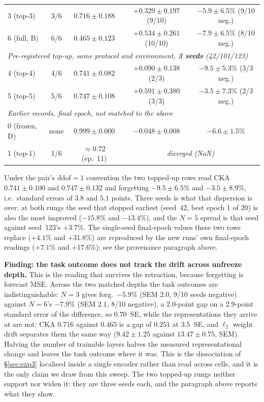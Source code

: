 \begin{table}[!ht]
\begin{tabular}{lcccc}
3 (top-3)    & 3/6   & $0.716{\pm}0.188$ & $+0.329{\pm}0.197$ (9/10) & $-5.9{\pm}6.5$\% (9/10 neg.) \\
6 (full, B)  & 6/6   & $0.465{\pm}0.123$ & $+0.534{\pm}0.261$ (10/10) & $-7.9{\pm}6.5$\% (8/10 neg.) \\
\midrule
\multicolumn{5}{l}{\emph{Pre-registered top-up, same protocol and environment, \textbf{3 seeds} (42/101/123)}} \\
4 (top-4)    & 4/6   & $0.741{\pm}0.082$ & $+0.090{\pm}0.138$ (2/3) & $-9.5{\pm}5.3$\% (3/3 neg.) \\
5 (top-5)    & 5/6   & $0.747{\pm}0.108$ & $+0.591{\pm}0.380$ (3/3) & $-3.5{\pm}7.3$\% (2/3 neg.) \\
\midrule
\multicolumn{5}{l}{\emph{Earlier records, final epoch, not matched to the above}} \\
0 (frozen, D) & none & $0.999{\pm}0.000$ & $-0.048{\pm}0.008$ & $-6.6{\pm}1.5$\% \\
1 (top-1)    & 1/6   & $\approx$0.72 (ep.\ 11) & \multicolumn{2}{c}{\textit{diverged (NaN)}} \\
\bottomrule
\end{tabular}
\vspace{2pt}
{\small Under the pair's $\mathrm{ddof}{=}1$ convention the two topped-up rows read
CKA $0.741{\pm}0.100$ and $0.747{\pm}0.132$ and forgetting $-9.5{\pm}6.5$\% and
$-3.5{\pm}8.9$\%, i.e.\ standard errors of $3.8$ and $5.1$ points.  Three seeds
is what that dispersion is over: at both rungs the seed that stopped earliest
(seed~42, best epoch 1 of 20) is also the most improved ($-15.8$\% and
$-13.4$\%), and the $N{=}5$ spread is that seed against seed~123's $+3.7$\%.  The
single-seed final-epoch values these two rows replace ($+4.1$\% and $+31.8$\%)
are reproduced by the new runs' own final-epoch readings ($+7.1$\% and
$+17.6$\%); see the provenance paragraph above.}
\vspace{-2pt}
\end{table}

\textbf{Finding: the task outcome does not track the drift across unfreeze
depth.}  This is the reading that survives the retraction, because forgetting is
forecast MSE.  Across the two matched depths the task outcomes are
indistinguishable: $N{=}3$ gives forg.\ $-5.9$\% (SEM $2.0$, 9/10 seeds
negative) against $N{=}6$'s $-7.9$\% (SEM $2.1$, 8/10 negative), a 2.0-point gap
on a 2.9-point standard error of the difference, so $0.70$~SE, while the
representations they arrive at are not: CKA $0.716$ against $0.465$ is a gap of
$0.251$ at $3.5$~SE, and $\ell_2$ weight drift separates them the same way
($9.42{\pm}1.25$ against $13.47{\pm}0.75$, SEM).  Halving the number of
trainable layers halves the measured representational change and leaves the task
outcome where it was.  This is the dissociation of \S\ref{sec:exp3} localised
inside a single encoder rather than read across cells, and it is the only claim we
draw from this sweep.  The two topped-up rungs neither support nor widen it: they
are three seeds each, and the paragraph above reports what they show.

